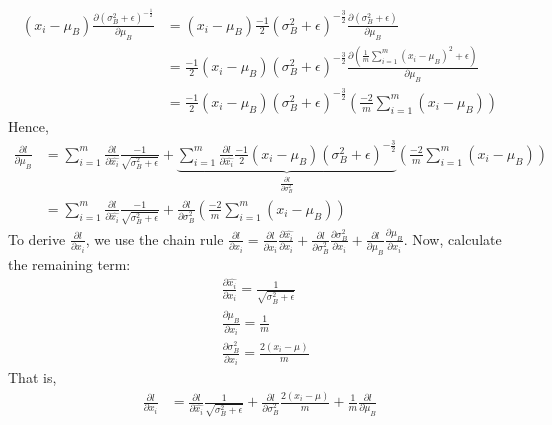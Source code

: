 \documentclass{article}
\begin{document}
{\begin{align*}
    (x_i - \mu_B)\frac{\partial (\sigma^2_B + \epsilon)^{-\frac{1}{2}}}{\partial \mu_B} &= (x_i-\mu_B)\frac{-1}{2}(\sigma^2_B + \epsilon)^{-\frac{3}{2}}\frac{\partial (\sigma^2_B + \epsilon)}{\partial\mu_B}\\
    &=\frac{-1}{2}(x_i - \mu_B)(\sigma^2_B + \epsilon)^{-\frac{3}{2}}\frac{\partial\left(\frac{1}{m} \sum^{m}_{i=1}(x_i-\mu _B)^2 + \epsilon\right)}{\partial\mu_B}\\
    &= \frac{-1}{2}(x_i - \mu_B)(\sigma^2_B + \epsilon)^{-\frac{3}{2}}\left(\frac{-2}{m}\sum_{i=1}^m(x_i-\mu_B)\right)
\end{align*}
Hence, 
\begin{align*}
    \frac{\partial l}{\partial \mu_B}  &= \sum_{i=1}^{m}\frac{\partial l}{\partial \hat{x_i}}\frac{-1}{\sqrt{\sigma^2_B + \epsilon}} + \underbrace{\sum_{i=1}^{m}\frac{\partial l}{\partial \hat{x_i}}\frac{-1}{2}(x_i - \mu_B)(\sigma^2_B + \epsilon)^{-\frac{3}{2}}}_{\frac{\partial l}{\partial \sigma^2_B}}\left(\frac{-2}{m}\sum_{i=1}^m(x_i-\mu_B)\right)\\
    &= \sum_{i=1}^{m}\frac{\partial l}{\partial \hat{x_i}}\frac{-1}{\sqrt{\sigma^2_B + \epsilon}} + \frac{\partial l}{\partial \sigma^2_B}\left(\frac{-2}{m}\sum_{i=1}^m(x_i-\mu_B)\right)
\end{align*}
To derive $\frac{\partial l}{\partial x_i}$, we use the chain rule $\frac{\partial l}{\partial x_i} = \frac{\partial l}{\partial \hat{x_i}}\frac{\partial \hat{x_i}}{\partial x_i} + \frac{\partial l}{\partial \sigma^2_B}\frac{\partial \sigma^2_B}{\partial x_i} + \frac{\partial l}{\partial \mu_B}\frac{\partial \mu_B}{\partial x_i}$. Now, calculate the remaining term:
\begin{align*}
    &\frac{\partial \hat{x_i}}{\partial x_i} = \frac{1}{\sqrt{\sigma^2_B + \epsilon}}\\
    &\frac{\partial \mu_B}{\partial x_i} = \frac{1}{m}\\
    &\frac{\partial \sigma^2_B}{\partial x_i} = \frac{2(x_i - \mu)}{m}
\end{align*}
That is, 
\begin{align*}
    \frac{\partial l}{\partial x_i} &= \frac{\partial l}{\partial \hat{x_i}}\frac{1}{\sqrt{\sigma^2_B + \epsilon}} + \frac{\partial l}{\partial \sigma^2_B}\frac{2(x_i - \mu)}{m} + \frac{1}{m}\frac{\partial l}{\partial \mu_B}
\end{align*}}


\newpage
\end{document}
